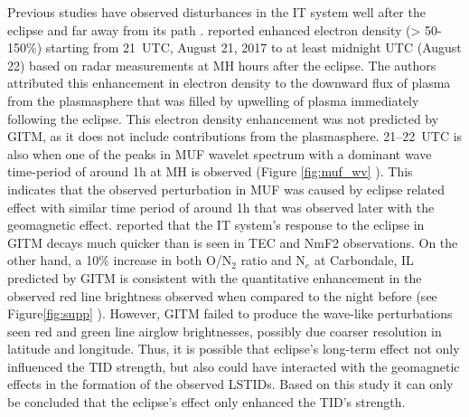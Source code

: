 \documentclass[crop=false,class=mitthesis,oneside,font=12pt]{standalone}
\begin{document}
Previous studies have observed disturbances in the IT system well after the eclipse and far away from its path \citep[e.g,][]{harding_nightside_eclipse,eclipse_belg}. \citet{goncharenko_mh_hill_eclipse} reported enhanced electron density (> 50-150\%) starting from 21~UTC, August 21, 2017 to at least midnight UTC (August 22) based on radar measurements at MH hours after the eclipse.  The authors attributed this enhancement in electron density to the downward flux of plasma from the plasmasphere that was filled by upwelling of plasma immediately following the eclipse. This electron density enhancement was not predicted by GITM, as it does not include contributions from the plasmasphere. 21--22~UTC is also when one of the peaks in MUF wavelet spectrum with a dominant wave time-period of around 1h at MH is observed (Figure \ref{fig:muf_wv} ). This indicates that the observed perturbation in MUF was caused by eclipse related effect with similar time period of around 1h that was observed later with the geomagnetic effect. \citet{wu_gitm-data_2018} reported that the IT system's response to the eclipse in GITM decays much quicker than is seen in TEC and NmF2 observations. On the other hand, a 10\% increase in both O/N$_2$ ratio and N$_e$ at Carbondale, IL predicted by GITM is consistent with the quantitative enhancement in the observed red line brightness observed when compared to the night before (see Figure\ref{fig:supp} ). However, GITM failed to produce the wave-like perturbations seen red and green line airglow brightnesses, possibly due coarser resolution in latitude and longitude. Thus, it is possible that eclipse's long-term effect not only influenced the TID strength, but also could have interacted with the geomagnetic effects in the formation of the observed LSTIDs. Based on this study it can only be concluded that the eclipse's effect only enhanced the TID's strength. 
% 
% 
% 
% 
% 
%
\end{document}
